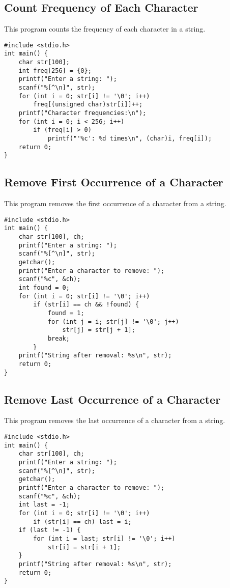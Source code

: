 \documentclass[a4paper,12pt]{article}
\begin{document}
\subsection{Count Frequency of Each Character}
This program counts the frequency of each character in a string.
\begin{lstlisting}[caption={Count Frequency of Each Character}]
#include <stdio.h>
int main() {
    char str[100];
    int freq[256] = {0};
    printf("Enter a string: ");
    scanf("%[^\n]", str);
    for (int i = 0; str[i] != '\0'; i++)
        freq[(unsigned char)str[i]]++;
    printf("Character frequencies:\n");
    for (int i = 0; i < 256; i++)
        if (freq[i] > 0)
            printf("'%c': %d times\n", (char)i, freq[i]);
    return 0;
}
\end{lstlisting}
\clearpage

\subsection{Remove First Occurrence of a Character}
This program removes the first occurrence of a character from a string.
\begin{lstlisting}[caption={Remove First Occurrence of a Character}]
#include <stdio.h>
int main() {
    char str[100], ch;
    printf("Enter a string: ");
    scanf("%[^\n]", str);
    getchar();
    printf("Enter a character to remove: ");
    scanf("%c", &ch);
    int found = 0;
    for (int i = 0; str[i] != '\0'; i++)
        if (str[i] == ch && !found) {
            found = 1;
            for (int j = i; str[j] != '\0'; j++)
                str[j] = str[j + 1];
            break;
        }
    printf("String after removal: %s\n", str);
    return 0;
}
\end{lstlisting}
\clearpage

\subsection{Remove Last Occurrence of a Character}
This program removes the last occurrence of a character from a string.
\begin{lstlisting}[caption={Remove Last Occurrence of a Character}]
#include <stdio.h>
int main() {
    char str[100], ch;
    printf("Enter a string: ");
    scanf("%[^\n]", str);
    getchar();
    printf("Enter a character to remove: ");
    scanf("%c", &ch);
    int last = -1;
    for (int i = 0; str[i] != '\0'; i++)
        if (str[i] == ch) last = i;
    if (last != -1) {
        for (int i = last; str[i] != '\0'; i++)
            str[i] = str[i + 1];
    }
    printf("String after removal: %s\n", str);
    return 0;
}
\end{lstlisting}
\clearpage
\end{document}
